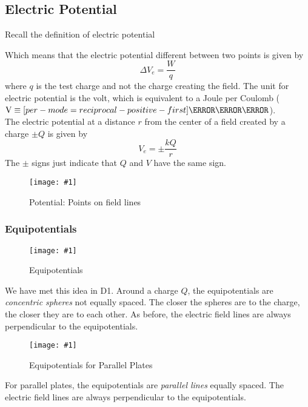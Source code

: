 \documentclass[a4paper,12pt]{article}
\let\oldsi\si
\renewcommand{\si}[1]{\oldsi[per-mode=reciprocal-positive-first]{#1}}
\newcommand{\lb}{\\[8pt]}
\newcommand{\img}[4]{\begin{center}
  \begin{figure}[H]
    \centering
    \texttt{[image: \#1]}
    \caption{#3}
    \label{fig:#4}
  \end{figure}
\end{center}}
\begin{document}
\pagebreak

\subsection{Electric Potential}

Recall the definition of electric potential
\begin{center}
\end{center}
Which means that the electric potential different between two points is given by
\begin{equation}\label{eq:potential}
  \Delta V_e = \frac{W}{q}
\end{equation}
where $q$ is the test charge and not the charge creating the field.
The unit for electric potential is the volt, which is equivalent to a Joule per Coulomb ($\text{V} \equiv \si{\J\per\C}$).\lb
The electric potential at a distance $r$ from the center of a field created by a charge $\pm Q$ is given by
\begin{equation}\label{eq:potential__}
  V_e = \pm \frac{kQ}{r}
\end{equation}
The $\pm$ signs just indicate that $Q$ and $V$ have the same sign.

\img{linespotential.png}{0.5}{Potential: Points on field lines}{linespotential}

\subsubsection{Equipotentials}

\begin{minipage}{0.45\textwidth}
  \img{sphereequipotential.png}{1}{Equipotentials}{sphereequipotential}

  We have met this idea in D1. Around a charge $Q$, the equipotentials are \textit{concentric spheres} not equally spaced. The closer the spheres are to the charge, the closer they are to each other. As before, the electric field lines are always perpendicular to the equipotentials.
\end{minipage}\hspace*{0.1\textwidth}
\begin{minipage}{0.45\textwidth}
  \img{platesequipotential.png}{1}{Equipotentials for Parallel Plates}{platesequipotential}

  For parallel plates, the equipotentials are \textit{parallel lines} equally spaced. The electric field lines are always perpendicular to the equipotentials.
\end{minipage}\lb
\end{document}
